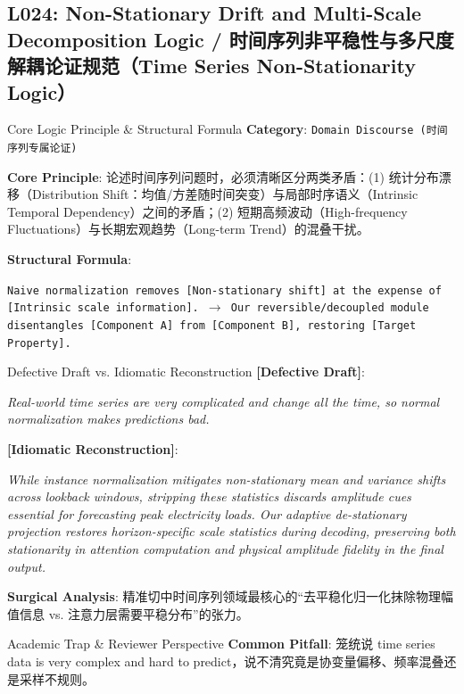 \subsection{L024: Non-Stationary Drift and Multi-Scale Decomposition Logic / 时间序列非平稳性与多尺度解耦论证规范（Time Series Non-Stationarity Logic）}\label{sec:logic:L024}
\begin{ConceptBox}{Core Logic Principle \& Structural Formula}
\textbf{Category}: \texttt{Domain Discourse (时间序列专属论证)}\par\vspace{3pt}
\textbf{Core Principle}: 论述时间序列问题时，必须清晰区分两类矛盾：(1)  统计分布漂移（Distribution Shift：均值/方差随时间突变）与局部时序语义（Intrinsic Temporal Dependency）之间的矛盾；(2)  短期高频波动（High-frequency Fluctuations）与长期宏观趋势（Long-term Trend）的混叠干扰。\par\vspace{4pt}
\textbf{Structural Formula}:\par\noindent\texttt{Naive normalization removes [Non-stationary shift] at the expense of [Intrinsic scale information]. $\to$ Our reversible/decoupled module disentangles [Component A] from [Component B], restoring [Target Property].}
\end{ConceptBox}
\begin{ExampleBox}{Defective Draft vs. Idiomatic Reconstruction}
\textbf{\color{TargetHighlight}[Defective Draft]}:\par\textit{Real-world time series are very complicated and change all the time, so normal normalization makes predictions bad.}\par\vspace{4pt}
\textbf{\color{AcadNavy}[Idiomatic Reconstruction]}:\par\textit{While instance normalization mitigates non-stationary mean and variance shifts across lookback windows, stripping these statistics discards amplitude cues essential for forecasting peak electricity loads. Our adaptive de-stationary projection restores horizon-specific scale statistics during decoding, preserving both stationarity in attention computation and physical amplitude fidelity in the final output.}\par\vspace{4pt}
\textbf{Surgical Analysis}: 精准切中时间序列领域最核心的“去平稳化归一化抹除物理幅值信息 vs. 注意力层需要平稳分布”的张力。
\end{ExampleBox}
\begin{TipBox}{Academic Trap \& Reviewer Perspective}
\textbf{Common Pitfall}: 笼统说 time series data is very complex and hard to predict，说不清究竟是协变量偏移、频率混叠还是采样不规则。
\end{TipBox}
\vspace{6pt}
